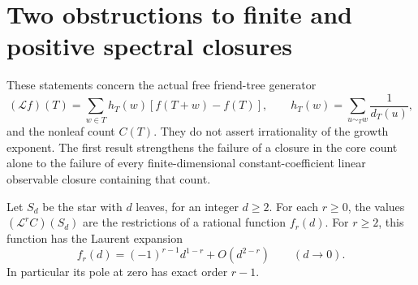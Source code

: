 \section{Two obstructions to finite and positive spectral closures}
\label{fgo:section}

These statements concern the actual free friend-tree generator
\[
 (\mathcal L f)(T)=\sum_{w\in T}h_T(w)[f(T+w)-f(T)],
 \qquad h_T(w)=\sum_{u\sim_Tw}\frac1{d_T(u)},
\]
and the nonleaf count $C(T)$. They do not assert irrationality of the
growth exponent. The first result strengthens the failure of a closure
in the core count alone to the failure of every finite-dimensional
constant-coefficient linear observable closure containing that count.

\begin{lemma}
\label{fgo:star-pole}
Let $S_d$ be the star with $d$ leaves, for an integer $d\ge2$. For each
$r\ge0$, the values $(\mathcal L^r C)(S_d)$ are the restrictions of a
rational function $f_r(d)$. For $r\ge2$, this function has the Laurent
expansion
\[
 f_r(d)=(-1)^{r-1}d^{1-r}+O(d^{2-r})\qquad(d\to0).
\]
In particular its pole at zero has exact order $r-1$.
\end{lemma}
